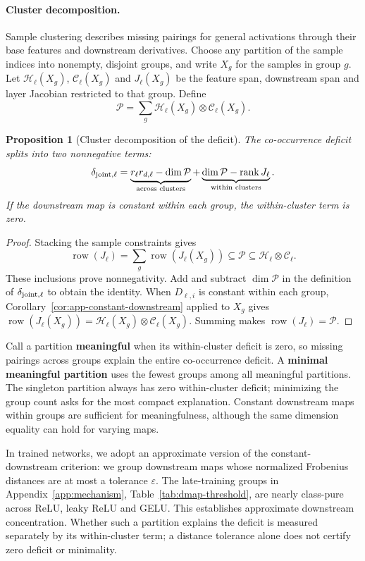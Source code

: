\documentclass[twoside]{article}
\newtheorem{proposition}[theorem]{Proposition}
\theoremstyle{remark}
\DeclareMathOperator{\rank}{rank}
\newcommand{\cC}{\mathcal C}
\newcommand{\cH}{\mathcal H}
\newcommand{\cP}{\mathcal P}
\theoremstyle{highlightdefinition}
\theoremstyle{remark}
\begin{document}
\paragraph{Cluster decomposition.}
Sample clustering describes missing pairings for general activations through their base features and downstream derivatives. Choose any partition of the sample indices into nonempty, disjoint groups, and write $X_g$ for the samples in group $g$. Let $\cH_\ell(X_g)$, $\cC_\ell(X_g)$ and $J_\ell(X_g)$ be the feature span, downstream span and layer Jacobian restricted to that group. Define
\[
 \cP=\sum_g\cH_\ell(X_g)\otimes\cC_\ell(X_g).
\]
\begin{proposition}[Cluster decomposition of the deficit]
The co-occurrence deficit splits into two nonnegative terms:
\[
 \delta_{\rm joint,\ell}
 =\underbrace{r_\ell r_{d,\ell}-\dim\cP}_{\text{across clusters}}
 +\underbrace{\dim\cP-\rank J_\ell}_{\text{within clusters}}.
\]
If the downstream map is constant within each group, the within-cluster term is zero.
\end{proposition}
\begin{proof}
Stacking the sample constraints gives
\[
 \operatorname{row}(J_\ell)=\sum_g\operatorname{row}(J_\ell(X_g))
 \subseteq\cP\subseteq\cH_\ell\otimes\cC_\ell.
\]
These inclusions prove nonnegativity. Add and subtract $\dim\cP$ in the definition of $\delta_{\rm joint,\ell}$ to obtain the identity. When $D_{\ell,i}$ is constant within each group, Corollary~\ref{cor:app-constant-downstream} applied to $X_g$ gives $\operatorname{row}(J_\ell(X_g))=\cH_\ell(X_g)\otimes\cC_\ell(X_g)$. Summing makes $\operatorname{row}(J_\ell)=\cP$.
\end{proof}


Call a partition \textbf{meaningful} when its within-cluster deficit is zero, so missing pairings across groups explain the entire co-occurrence deficit. A \textbf{minimal meaningful partition} uses the fewest groups among all meaningful partitions. The singleton partition always has zero within-cluster deficit; minimizing the group count asks for the most compact explanation. Constant downstream maps within groups are sufficient for meaningfulness, although the same dimension equality can hold for varying maps.

In trained networks, we adopt an approximate version of the constant-downstream criterion: we group downstream maps whose normalized Frobenius distances are at most a tolerance $\varepsilon$. The late-training groups in Appendix~\ref{app:mechanism}, Table~\ref{tab:dmap-threshold}, are nearly class-pure across ReLU, leaky ReLU and GELU. This establishes approximate downstream concentration. Whether such a partition explains the deficit is measured separately by its within-cluster term; a distance tolerance alone does not certify zero deficit or minimality.
\end{document}
